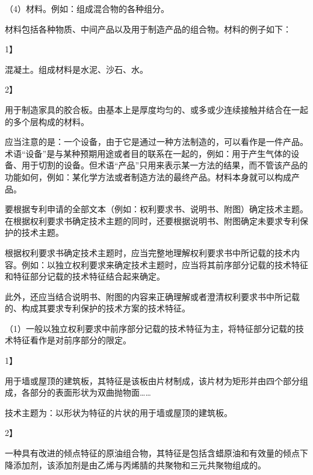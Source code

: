 {\setlength{\parindent}{17.1bp}（4）材料。例如：组成混合物的各种组分。\par}

材料包括各种物质、中间产品以及用于制造产品的组合物。材料的例子如下：

{1】\par}

混凝土。组成材料是水泥、沙石、水。

{2】\par}

用于制造家具的胶合板。由基本上是厚度均匀的、或多或少连续接触并结合在一起的多个层构成的材料。

应当注意的是：一个设备，由于它是通过一种方法制造的，可以看作是一件产品。术语“设备”是与某种预期用途或者目的联系在一起的，例如：用于产生气体的设备、用于切割的设备。但术语“产品”只用来表示某一方法的结果，而不管该产品的功能如何，例如：某化学方法或者制造方法的最终产品。材料本身就可以构成产品。

要根据专利申请的全部文本（例如：权利要求书、说明书、附图）确定技术主题。在根据权利要求书确定技术主题的同时，还要根据说明书、附图确定未要求专利保护的技术主题。

根据权利要求书确定技术主题时，应当完整地理解权利要求书中所记载的技术内容。例如：以独立权利要求来确定技术主题时，应当将其前序部分记载的技术特征和特征部分记载的技术特征结合起来确定。

此外，还应当结合说明书、附图的内容来正确理解或者澄清权利要求书中所记载的、构成其要求专利保护的技术方案的技术特征。

{\setlength{\parindent}{17.1bp}（1）一般以独立权利要求中前序部分记载的技术特征为主，将特征部分记载的技术特征看作是对前序部分的限定。\par}

{1】\par}

用于墙或屋顶的建筑板，其特征是该板由片材制成，该片材为矩形并由四个部分组成，各部分的表面形状为双曲抛物面……

技术主题为：以形状为特征的片状的用于墙或屋顶的建筑板。

{2】\par}

一种具有改进的倾点特征的原油组合物，其特征是包括含蜡原油和有效量的倾点下降添加剂，该添加剂是由乙烯与丙烯腈的共聚物和三元共聚物组成的。

